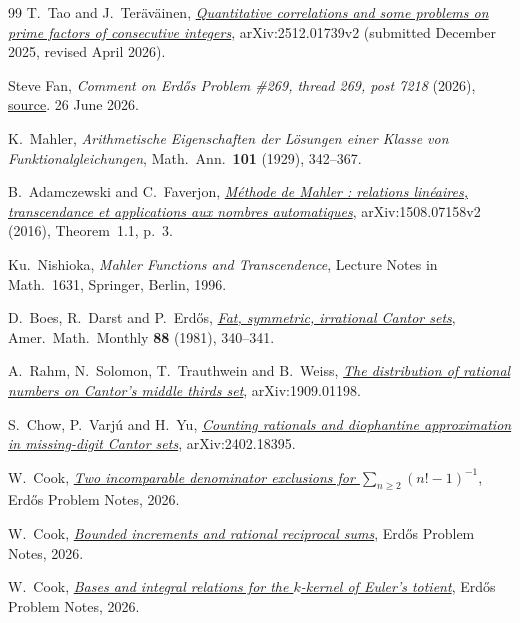\documentclass[11pt]{article}
\begin{document}
\begin{thebibliography}{99}
 T.~Tao and J.~Ter\"av\"ainen,
  \href{https://arxiv.org/abs/2512.01739v2}{\emph{Quantitative correlations and
  some problems on prime factors of consecutive integers}}, arXiv:2512.01739v2
  (submitted December 2025, revised April 2026).

 Steve Fan,
  \emph{Comment on Erd\H{o}s Problem \#269, thread 269, post 7218} (2026),
  \href{https://www.erdosproblems.com/forum/thread/269#post-7218}{source}. 26 June 2026.

 K.~Mahler, \emph{Arithmetische Eigenschaften der L\"osungen
  einer Klasse von Funktionalgleichungen}, Math.\ Ann.\ \textbf{101} (1929),
  342--367.

 B.~Adamczewski and C.~Faverjon,
  \href{https://arxiv.org/abs/1508.07158v2}{\emph{M\'ethode de Mahler : relations
  lin\'eaires, transcendance et applications aux nombres automatiques}},
  arXiv:1508.07158v2 (2016), Theorem~1.1, p.~3.

 Ku.~Nishioka, \emph{Mahler Functions and Transcendence},
  Lecture Notes in Math.\ 1631, Springer, Berlin, 1996.

 D.~Boes, R.~Darst and P.~Erd\H{o}s,
  \href{https://www.tandfonline.com/doi/abs/10.1080/00029890.1981.11995266}{\emph{Fat,
  symmetric, irrational Cantor sets}}, Amer.\ Math.\ Monthly \textbf{88} (1981),
  340--341.

 A.~Rahm, N.~Solomon, T.~Trauthwein and B.~Weiss,
  \href{https://arxiv.org/abs/1909.01198}{\emph{The distribution of rational
  numbers on Cantor's middle thirds set}}, arXiv:1909.01198.

 S.~Chow, P.~Varj\'u and H.~Yu,
  \href{https://arxiv.org/abs/2402.18395}{\emph{Counting rationals and
  diophantine approximation in missing-digit Cantor sets}}, arXiv:2402.18395.

 W.~Cook,
  \href{erdos-68-factorial-denominator-irrationality.pdf}{\emph{Two
  incomparable denominator exclusions for $\sum_{n\ge2}(n!-1)^{-1}$}},
  Erd\H{o}s Problem Notes, 2026.

 W.~Cook,
  \href{erdos-243-reciprocal-tail-rigidity.pdf}{\emph{Bounded
  increments and rational reciprocal sums}}, Erd\H{o}s Problem Notes, 2026.

 W.~Cook,
  \href{erdos-249-binary-totient-series.pdf}{\emph{Bases and
  integral relations for the $k$-kernel of Euler's totient}}, Erd\H{o}s Problem
  Notes, 2026.


\end{thebibliography}
\end{document}
